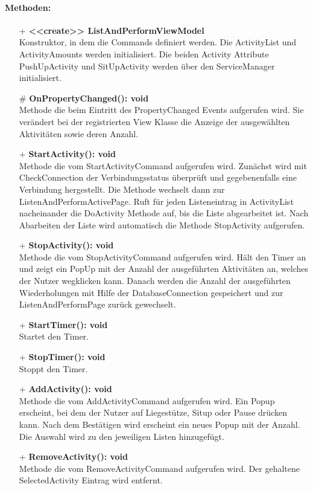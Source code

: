 \documentclass[a4paper,12pt]{article}
\begin{document}
\paragraph{Methoden:}
\begin{itemize}
	\item[+] \textbf{<<create>> ListAndPerformViewModel} \\ Konstruktor, in dem die Commands definiert werden. Die ActivityList und ActivityAmounts werden initialisiert. Die beiden Activity Attribute PushUpActivity und SitUpActivity werden über den ServiceManager initialisiert.
	\item[\#] \textbf{OnPropertyChanged(): void} \\ Methode die beim Eintritt des PropertyChanged Events aufgerufen wird. Sie verändert bei der registrierten View Klasse die Anzeige der ausgewählten Aktivitäten sowie deren Anzahl. 
	\item[+] \textbf{StartActivity(): void} \\ Methode die vom StartActivityCommand aufgerufen wird. Zunächst wird mit CheckConnection der Verbindungsstatus überprüft und gegebenenfalls eine Verbindung hergestellt. Die Methode wechselt dann zur ListenAndPerformActivePage. Ruft für jeden Listeneintrag in ActivityList nacheinander die DoActivity Methode auf, bis die Liste abgearbeitet ist. Nach Abarbeiten der Liste wird automatisch die Methode StopActivity aufgerufen.
	\item[+] \textbf{StopActivity(): void} \\ Methode die vom StopActivityCommand aufgerufen wird. Hält den Timer an und zeigt ein PopUp mit der Anzahl der ausgeführten Aktivitäten an, welches der Nutzer wegklicken kann. Danach werden die Anzahl der ausgeführten Wiederholungen mit Hilfe der DatabaseConnection gespeichert und zur ListenAndPerformPage zurück gewechselt. 
	\item[+] \textbf{StartTimer(): void} \\ Startet den Timer. 
	\item[+] \textbf{StopTimer(): void} \\ Stoppt den Timer. 
	\item[+] \textbf{ AddActivity(): void} \\  Methode die vom AddActivityCommand aufgerufen wird. Ein Popup erscheint, bei dem der Nutzer auf Liegestütze, Situp oder Pause drücken kann. Nach dem Bestätigen wird erscheint ein neues Popup mit der Anzahl. Die Auswahl wird zu den jeweiligen Listen hinzugefügt. 
	\item[+] \textbf{RemoveActivity(): void} \\  Methode die vom RemoveActivityCommand aufgerufen wird. Der gehaltene SelectedActivity Eintrag wird entfernt. 

\end{itemize}
\end{document}
